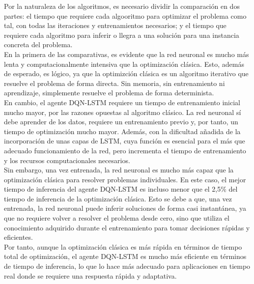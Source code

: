 Por la naturaleza de los algoritmos, es necesario dividir la comparación en dos partes: el tiempo
que requiere cada algooritmo para optimizar el problema como tal, con todas las iteraciones y
entrenamientos necesarios; y el tiempo que requiere cada algoritmo para inferir o llegra a una 
solución para una instancia concreta del problema.\\

En la primera de las comparativas, es evidente que la red neuronal es mucho más lenta y 
computacionalmente intensiva que la optimización clásica. Esto, además de esperado, es lógico, ya 
que la optimizción clásica es un algoritmo iterativo que resuelve el problema de forma directa. Sin
memoria, sin entrenamiento ni aprendizaje, simplemente resuelve el problema de forma
determinista.\\

En cambio, el agente DQN-LSTM requiere un tiempo de entrenamiento inicial mucho mayor, por las 
razones opuestas al algoritmo clásico. La red neuronal sí debe aprender de los datos,
requiere un entrenamiento previo y, por tanto, un tiempo de optimización mucho mayor. Además, con
la dificultad añadida de la incorporación de unas capas de LSTM, cuya función es esencial para el 
más que adecuado funcionamiento de la red, pero incrementa el tiempo de entrenamiento y los recursos
computacionales necesarios.\\

Sin embargo, una vez entrenada, la red neuronal es mucho más capaz que la optimización clásica
para resolver problemas individuales. En este caso, el mejor tiempo de inferencia del agente DQN-LSTM
es incluso menor que el 2,5\% del tiempo de inferencia de la optimización clásica.
Esto se debe a que, una vez entrenada, la red neuronal puede inferir soluciones de forma casi
instantánea, ya que no requiere volver a resolver el problema desde cero, sino que utiliza el
conocimiento adquirido durante el entrenamiento para tomar decisiones rápidas y eficientes.\\

Por tanto, aunque la optimización clásica es más rápida en términos de tiempo total de optimización,
el agente DQN-LSTM es mucho más eficiente en términos de tiempo de inferencia, lo que lo hace
más adecuado para aplicaciones en tiempo real donde se requiere una respuesta rápida y adaptativa.\\